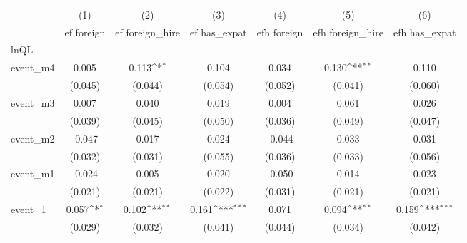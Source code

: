 {
\def\sym#1{\ifmmode^{#1}\else\(^{#1}\)\fi}
\begin{tabular}{l*{6}{c}}
\hline\hline
            &\multicolumn{1}{c}{(1)}&\multicolumn{1}{c}{(2)}&\multicolumn{1}{c}{(3)}&\multicolumn{1}{c}{(4)}&\multicolumn{1}{c}{(5)}&\multicolumn{1}{c}{(6)}\\
            &\multicolumn{1}{c}{ef foreign}&\multicolumn{1}{c}{ef foreign\_hire}&\multicolumn{1}{c}{ef has\_expat}&\multicolumn{1}{c}{efh foreign}&\multicolumn{1}{c}{efh foreign\_hire}&\multicolumn{1}{c}{efh has\_expat}\\
\hline
lnQL        &                     &                     &                     &                     &                     &                     \\
event\_m4    &       0.005         &       0.113\sym{*}  &       0.104         &       0.034         &       0.130\sym{**} &       0.110         \\
            &     (0.045)         &     (0.044)         &     (0.054)         &     (0.052)         &     (0.041)         &     (0.060)         \\
[1em]
event\_m3    &       0.007         &       0.040         &       0.019         &       0.004         &       0.061         &       0.026         \\
            &     (0.039)         &     (0.045)         &     (0.050)         &     (0.036)         &     (0.049)         &     (0.047)         \\
[1em]
event\_m2    &      -0.047         &       0.017         &       0.024         &      -0.044         &       0.033         &       0.031         \\
            &     (0.032)         &     (0.031)         &     (0.055)         &     (0.036)         &     (0.033)         &     (0.056)         \\
[1em]
event\_m1    &      -0.024         &       0.005         &       0.020         &      -0.050         &       0.014         &       0.023         \\
            &     (0.021)         &     (0.021)         &     (0.022)         &     (0.031)         &     (0.021)         &     (0.021)         \\
[1em]
event\_1     &       0.057\sym{*}  &       0.102\sym{**} &       0.161\sym{***}&       0.071         &       0.094\sym{**} &       0.159\sym{***}\\
            &     (0.029)         &     (0.032)         &     (0.041)         &     (0.044)         &     (0.034)         &     (0.042)         \\

\end{tabular}}
